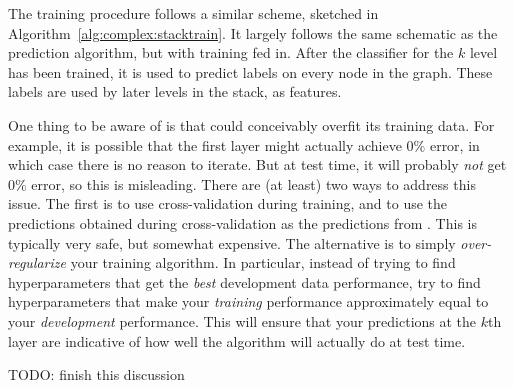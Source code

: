 The training procedure follows a similar scheme, sketched in
Algorithm~\ref{alg:complex:stacktrain}.  It largely follows the same
schematic as the prediction algorithm, but with training fed in.
After the classifier for the $k$ level has been trained, it is used to
predict labels on every node in the graph.  These labels are used by
later levels in the stack, as features.

One thing to be aware of is that  could
conceivably overfit its training data.  For example, it is possible
that the first layer might actually achieve $0\%$ error, in which case
there is no reason to iterate.  But at test time, it will probably
\emph{not} get $0\%$ error, so this is misleading.  There are (at
least) two ways to address this issue.  The first is to use
cross-validation during training, and to use the predictions obtained
during cross-validation as the predictions from .
This is typically very safe, but somewhat expensive.  The alternative
is to simply \emph{over-regularize} your training algorithm.  In
particular, instead of trying to find hyperparameters that
get the \emph{best} development data performance, try to find
hyperparameters that make your \emph{training} performance
approximately equal to your \emph{development} performance.  This will
ensure that your predictions at the $k$th layer are indicative of how
well the algorithm will actually do at test time.

TODO: finish this discussion

\begin{exercises}
\begin{Ex}
\TODO

\begin{solution}
\TODO
\end{solution}
\end{Ex}

\end{exercises}


